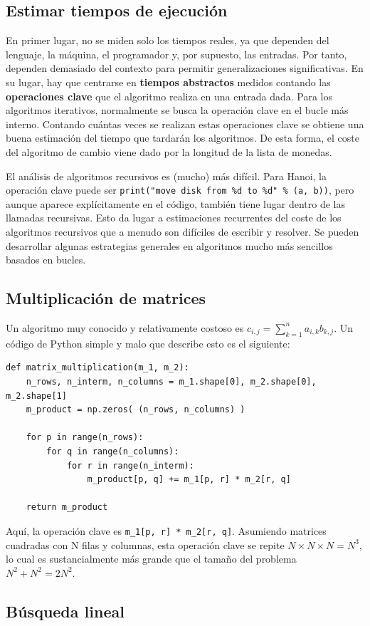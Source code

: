 \subsection{Estimar tiempos de ejecución}
En primer lugar, no se miden solo los tiempos reales, ya que dependen del lenguaje, la máquina, el programador y, por supuesto, las entradas. Por tanto, dependen demasiado del contexto para permitir generalizaciones significativas. En su lugar, hay que centrarse en \textbf{tiempos abstractos} medidos contando las \textbf{operaciones clave} que el algoritmo realiza en una entrada dada. Para los algoritmos iterativos, normalmente se busca la operación clave en el bucle más interno. Contando cuántas veces se realizan estas operaciones clave se obtiene una buena estimación del tiempo que tardarán los algoritmos. De esta forma, el coste del algoritmo de cambio viene dado por la longitud de la lista de monedas.

El análisis de algoritmos recursivos es (mucho) más difícil. Para Hanoi, la operación clave puede ser \texttt{print("move disk from \%d to \%d" \% (a, b))}, pero aunque aparece explícitamente en el código, también tiene lugar dentro de las llamadas recursivas. Esto da lugar a estimaciones recurrentes del coste de los algoritmos recursivos que a menudo son difíciles de escribir y resolver. Se pueden desarrollar algunas estrategias generales en algoritmos mucho más sencillos basados en bucles. 

\subsection{Multiplicación de matrices}
Un algoritmo muy conocido y relativamente costoso es $c_{i,j} = \sum^n_{k=1} a_{i,k}b_{k,j}$. Un código de Python simple y malo que describe esto es el siguiente:
\begin{lstlisting}
def matrix_multiplication(m_1, m_2):
	n_rows, n_interm, n_columns = m_1.shape[0], m_2.shape[0], m_2.shape[1]
	m_product = np.zeros( (n_rows, n_columns) )
	
	for p in range(n_rows):
		for q in range(n_columns):
			for r in range(n_interm):
				m_product[p, q] += m_1[p, r] * m_2[r, q]
				
	return m_product
\end{lstlisting}

Aquí, la operación clave es \texttt{m\_1[p, r] * m\_2[r, q]}. Asumiendo matrices cuadradas con N filas y columnas, esta operación clave se repite $N \times N \times N = N^3$, lo cual es sustancialmente más grande que el tamaño del problema $N^2 + N^2 = 2N^2$.

\subsection{Búsqueda lineal}